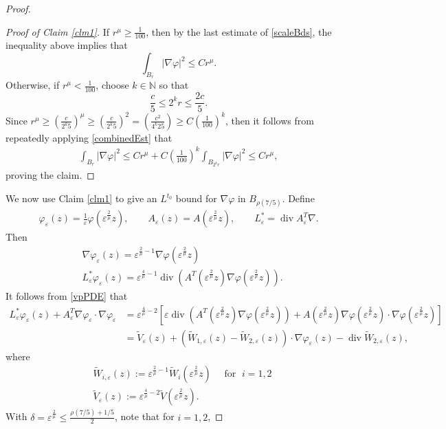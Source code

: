 \documentclass[12pt,reqno]{amsart}
\theoremstyle{plain}
\theoremstyle{definition}
\DeclareMathOperator{\di}{div}
\newcommand{\eps}{\varepsilon}
\newcommand{\vp}{\varphi}
\newcommand{\de}{\delta}
\newcommand{\gr}{\nabla}
\newcommand{\abs}[1]{\left\vert#1\right\vert}
\newcommand{\brac}[1]{\left[#1\right]}
\newcommand{\pr}[1]{\left( #1 \right) }
\newcommand{\N}{\ensuremath{\mathbb{N}}}
\begin{document}
\begin{proof}
\begin{proof}[Proof of Claim \ref{clm1}]
If $r^{\mu} \ge \frac{1}{100}$, then by the last estimate of \eqref{scaleBds}, the inequality above implies that
$$\int_{B_r} \abs{\gr \vp}^2 \le C r^{\mu}.$$
Otherwise, if $r^{\mu} < \frac{1}{100}$, choose $k \in \N$ so that
$$\frac{c}{5} \le 2^k r \le \frac{2c}{5}.$$
Since $r^{\mu} \ge \pr{\frac c {2^k 5}}^{\mu} \ge \pr{\frac c {2^k 5}}^{2} = \pr{\frac {c^2} {4^k 25}} \ge C \pr{\frac 1 {100}}^k$, then it follows from repeatedly applying \eqref{combinedEst} that
\begin{align*}
\int_{B_r} \abs{\gr \vp}^2
\le C r^{\mu} + C \pr{\frac{1}{100}}^k \int_{B_{2^kr}} \abs{\gr \vp}^2
\le C r^{\mu},
\end{align*}
proving the claim.
\end{proof}

We now use Claim \ref{clm1} to give an $L^{t_0}$ bound for $\gr \vp$ in $B_{\rho\pr{7/5}}$.
Define 
\begin{align*}
\vp_\eps\pr{z} = \frac{1}{\eps} \vp\pr{\eps^{\frac{2}{\mu}} z}, \qquad
A_\eps\pr{z} = A\pr{\eps^{\frac{2}{\mu}} z}, \qquad
L^*_\eps = \di A_\eps^T \gr.
\end{align*}
Then
\begin{align*}
&\gr \vp_\eps\pr{z} = \eps^{\frac 2 \mu -1}\gr \vp \pr{\eps^{\frac 2 \mu} z} \\
&L^*_\eps \vp_\eps\pr{z} = \eps^{\frac 4 \mu -1} \di\pr{ A^T\pr{\eps^{\frac 2 \mu}z} \gr \vp\pr{\eps^{\frac 2 \mu} z}}.
\end{align*}
It follows from \eqref{vpPDE} that
\begin{align*}
L^*_\eps \vp_\eps\pr{z} + A_\eps^T \gr \vp_\eps \cdot \gr \vp_\eps
&= \eps^{\frac 4 \mu -2} \brac{\eps \di\pr{ A^T\pr{\eps^{\frac 2 \mu}z} \gr \vp\pr{\eps^{\frac 2 \mu} z}} 
+ A\pr{\eps^{\frac{2}{\mu}} z} \gr \vp \pr{\eps^{\frac 2 \mu} z} \cdot \gr \vp \pr{\eps^{\frac 2 \mu} z}} \\
&= \widetilde V_\eps\pr{z}
 + \pr{\widetilde W_{1,\eps}\pr{z} - \widetilde W_{2,\eps}\pr{z}} \cdot \gr \vp_\eps\pr{z} 
- \di \widetilde W_{2,\eps}\pr{z},
\end{align*}
where
\begin{align*}
& \widetilde W_{i, \eps}\pr{z} :=  \eps^{\frac 2 \mu -1} \widetilde W_i\pr{\eps^{\frac 2 \mu} z} \quad \text{ for } \; i = 1, 2 \\
& \widetilde V_\eps\pr{z} := \eps^{\frac 4 \mu -2} \widetilde V\pr{\eps^{\frac 2 \mu} z} .
\end{align*}
With $\de = \eps^{\frac 2 \mu} \le \frac{\rho\pr{7/5} + 1/5}{2}$, note that for $i = 1, 2$,

\end{proof}
\end{document}
